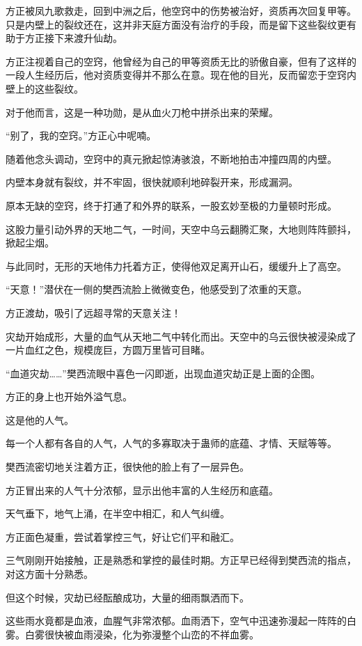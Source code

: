 \begin{this_body}
方正被凤九歌救走，回到中洲之后，他空窍中的伤势被治好，资质再次回复甲等。只是内壁上的裂纹还在，这并非天庭方面没有治疗的手段，而是留下这些裂纹更有助于方正接下来渡升仙劫。

方正注视着自己的空窍，他曾经为自己的甲等资质无比的骄傲自豪，但有了这样的一段人生经历后，他对资质变得并不那么在意。现在他的目光，反而留恋于空窍内壁上的这些裂纹。

对于他而言，这是一种功勋，是从血火刀枪中拼杀出来的荣耀。

“别了，我的空窍。”方正心中呢喃。

随着他念头调动，空窍中的真元掀起惊涛骇浪，不断地拍击冲撞四周的内壁。

内壁本身就有裂纹，并不牢固，很快就顺利地碎裂开来，形成漏洞。

原本无缺的空窍，终于打通了和外界的联系，一股玄妙至极的力量顿时形成。

这股力量引动外界的天地二气，一时间，天空中乌云翻腾汇聚，大地则阵阵颤抖，掀起尘烟。

与此同时，无形的天地伟力托着方正，使得他双足离开山石，缓缓升上了高空。

“天意！”潜伏在一侧的樊西流脸上微微变色，他感受到了浓重的天意。

方正渡劫，吸引了远超寻常的天意关注！

灾劫开始成形，大量的血气从天地二气中转化而出。天空中的乌云很快被浸染成了一片血红之色，规模庞巨，方圆万里皆可目睹。

“血道灾劫……”樊西流眼中喜色一闪即逝，出现血道灾劫正是上面的企图。

方正的身上也开始外溢气息。

这是他的人气。

每一个人都有各自的人气，人气的多寡取决于蛊师的底蕴、才情、天赋等等。

樊西流密切地关注着方正，很快他的脸上有了一层异色。

方正冒出来的人气十分浓郁，显示出他丰富的人生经历和底蕴。

天气垂下，地气上涌，在半空中相汇，和人气纠缠。

方正面色凝重，尝试着掌控三气，好让它们平和融汇。

三气刚刚开始接触，正是熟悉和掌控的最佳时期。方正早已经得到樊西流的指点，对这方面十分熟悉。

但这个时候，灾劫已经酝酿成功，大量的细雨飘洒而下。

这些雨水竟都是血液，血腥气非常浓郁。血雨洒下，空气中迅速弥漫起一阵阵的白雾。白雾很快被血雨浸染，化为弥漫整个山峦的不祥血雾。


\end{this_body}
